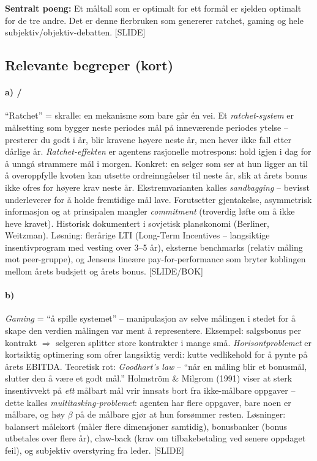 \textbf{Sentralt poeng:} Et måltall som er optimalt for ett formål er sjelden optimalt for de tre andre. Det er denne flerbruken som genererer ratchet, gaming og hele subjektiv/objektiv-debatten. [SLIDE]

\subsection*{Relevante begreper (kort)}

\paragraph{a) \quad\STwo/\SThree}
``Ratchet'' = skralle: en mekanisme som bare går én vei. Et \emph{ratchet-system} er målsetting som bygger neste periodes mål på inneværende periodes ytelse -- presterer du godt i år, blir kravene høyere neste år, men hever ikke fall etter dårlige år. \emph{Ratchet-effekten} er agentens rasjonelle motrespons: hold igjen i dag for å unngå strammere mål i morgen. Konkret: en selger som ser at hun ligger an til å overoppfylle kvoten kan utsette ordreinngåelser til neste år, slik at årets bonus ikke ofres for høyere krav neste år. Ekstremvarianten kalles \emph{sandbagging} -- bevisst underleverer for å holde fremtidige mål lave. Forutsetter gjentakelse, asymmetrisk informasjon og at prinsipalen mangler \emph{commitment} (troverdig løfte om å ikke heve kravet). Historisk dokumentert i sovjetisk planøkonomi (Berliner, Weitzman). Løsning: flerårige LTI (Long-Term Incentives -- langsiktige insentivprogram med vesting over 3--5 år), eksterne benchmarks (relativ måling mot peer-gruppe), og Jensens lineære pay-for-performance som bryter koblingen mellom årets budsjett og årets bonus. [SLIDE/BOK]

\paragraph{b) \quad\STwo}
\emph{Gaming} = ``å spille systemet'' -- manipulasjon av selve målingen i stedet for å skape den verdien målingen var ment å representere. Eksempel: salgsbonus per kontrakt $\Rightarrow$ selgeren splitter store kontrakter i mange små. \emph{Horisontproblemet} er kortsiktig optimering som ofrer langsiktig verdi: kutte vedlikehold for å pynte på årets EBITDA. Teoretisk rot: \emph{Goodhart's law} -- ``når en måling blir et bonusmål, slutter den å være et godt mål.'' Holmström \& Milgrom (1991) viser at sterk insentivvekt på \emph{ett} målbart mål vrir innsats bort fra ikke-målbare oppgaver -- dette kalles \emph{multitasking-problemet}: agenten har flere oppgaver, bare noen er målbare, og høy $\beta$ på de målbare gjør at hun forsømmer resten. Løsninger: balansert målekort (måler flere dimensjoner samtidig), bonusbanker (bonus utbetales over flere år), claw-back (krav om tilbakebetaling ved senere oppdaget feil), og subjektiv overstyring fra leder. [SLIDE]

